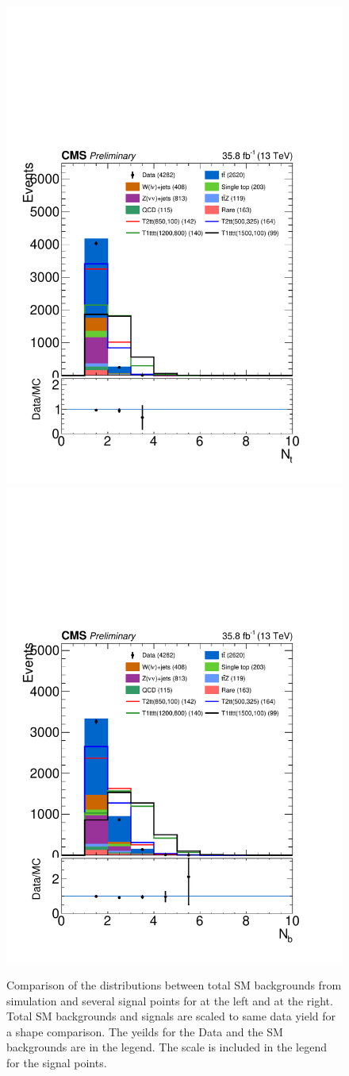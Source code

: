 \begin{figure}[h]
  \begin{center}
    \includegraphics[width=0.45\linewidth]{sections/mc4/EvtSelSBOpt/figures/DataMC_MET_model_NTops_baseline.pdf}
    \includegraphics[width=0.45\linewidth]{sections/mc4/EvtSelSBOpt/figures/DataMC_MET_model_NBJEts_baseline.pdf}\\
    \caption{Comparison of the distributions between total SM backgrounds from simulation and several signal points for \ntops at the left and \nbjets at the right. Total SM backgrounds and signals are scaled to same data yield for a shape comparison. The yeilds for the Data and the SM backgrounds are in the legend.  The scale is included in the legend for the signal points. }
    \label{fig:compSBvars1}
  \end{center}
\end{figure}

